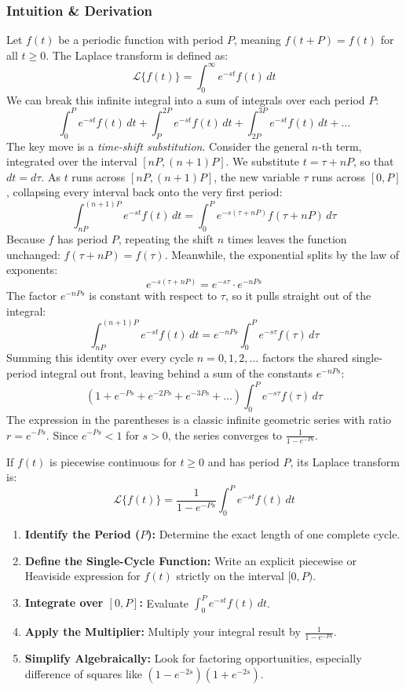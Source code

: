 \documentclass[11pt]{article}
\begin{document}
\subsubsection*{Intuition \& Derivation}
Let $f(t)$ be a periodic function with period $P$, meaning $f(t+P) = f(t)$ for all $t \geq 0$.
The Laplace transform is defined as:
\[ \mathcal{L}\{f(t)\} = \int_{0}^{\infty} e^{-st}f(t)\,dt \]
We can break this infinite integral into a sum of integrals over each period $P$:
\[ \int_{0}^{P} e^{-st}f(t)\,dt + \int_{P}^{2P} e^{-st}f(t)\,dt + \int_{2P}^{3P} e^{-st}f(t)\,dt + \dots \]
The key move is a \emph{time-shift substitution}. Consider the general $n$-th term, integrated over the interval $[nP, (n+1)P]$. We substitute $t = \tau + nP$, so that $d t = d\tau$. As $t$ runs across $[nP, (n+1)P]$, the new variable $\tau$ runs across $[0, P]$, collapsing every interval back onto the very first period:
\[ \int_{nP}^{(n+1)P} e^{-st}f(t)\,dt = \int_{0}^{P} e^{-s(\tau + nP)}f(\tau + nP)\,d\tau \]
Because $f$ has period $P$, repeating the shift $n$ times leaves the function unchanged: $f(\tau + nP) = f(\tau)$. Meanwhile, the exponential splits by the law of exponents:
\[ e^{-s(\tau + nP)} = e^{-s\tau}\cdot e^{-nPs} \]
The factor $e^{-nPs}$ is constant with respect to $\tau$, so it pulls straight out of the integral:
\[ \int_{nP}^{(n+1)P} e^{-st}f(t)\,dt = e^{-nPs}\int_{0}^{P} e^{-s\tau}f(\tau)\,d\tau \]
Summing this identity over every cycle $n = 0, 1, 2, \dots$ factors the shared single-period integral out front, leaving behind a sum of the constants $e^{-nPs}$:
\[ \left( 1 + e^{-Ps} + e^{-2Ps} + e^{-3Ps} + \dots \right) \int_{0}^{P} e^{-s\tau}f(\tau)\,d\tau \]
The expression in the parentheses is a classic infinite geometric series with ratio $r = e^{-Ps}$. Since $e^{-Ps} < 1$ for $s > 0$, the series converges to $\frac{1}{1 - e^{-Ps}}$.

\begin{formulabox}
If $f(t)$ is piecewise continuous for $t \geq 0$ and has period $P$, its Laplace transform is:
\[ \mathcal{L}\{f(t)\} = \frac{1}{1 - e^{-Ps}} \int_0^P e^{-st} f(t) \,dt \]
\end{formulabox}

\begin{methodbox}
\begin{enumerate}
    \item \textbf{Identify the Period ($P$):} Determine the exact length of one complete cycle.
    \item \textbf{Define the Single-Cycle Function:} Write an explicit piecewise or Heaviside expression for $f(t)$ strictly on the interval $[0, P)$.
    \item \textbf{Integrate over $[0, P]$:} Evaluate $\int_0^P e^{-st} f(t) \,dt$.
    \item \textbf{Apply the Multiplier:} Multiply your integral result by $\frac{1}{1 - e^{-Ps}}$.
    \item \textbf{Simplify Algebraically:} Look for factoring opportunities, especially difference of squares like $(1 - e^{-2s})(1 + e^{-2s})$.
\end{enumerate}
\end{methodbox}
\end{document}
